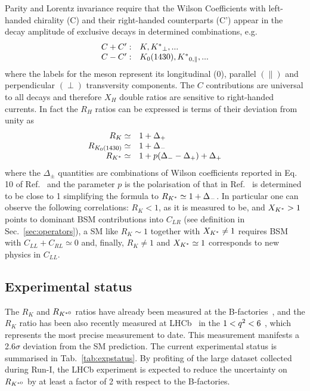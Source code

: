 Parity and Lorentz invariance require that the Wilson Coefficients with left-handed chirality (C)
and their right-handed counterparts (C') appear in the decay amplitude of exclusive decays in
determined combinations, e.g.
\begin{equation}
\begin{array}{ll}
C+C': & K, {{K}^*}_{\perp}, ...  \\
C-C': & K_0(1430), {{K}^*}_{0,\parallel}, ...
\end{array}
\end{equation}
where the labels for the \Kstar meson represent its longitudinal (0), parallel $(\parallel)$ and
perpendicular $(\perp)$ transversity components. The $C$ contributions are universal to
all decays and therefore $X_H$ double ratios are sensitive to right-handed currents.
In fact the $R_H$ ratios can be expressed is terms of their deviation from unity as
\begin{equation}
\begin{array}{rl}
R_K \simeq 			& 1+ \Delta_+ 		\\
R_{K_0(1430)} \simeq 	& 1+ \Delta_-		\\
R_{{K}^*} \simeq 		& 1+ p(\Delta_- - \Delta_+) + \Delta_+
\end{array}
\end{equation}
where the $\Delta_\pm$ quantities are combinations of Wilson coefficients
reported in Eq. 10 of Ref.~\cite{Hiller:2014ula} and the parameter $p$ is the polarisation of \Kstar
that in Ref.~\cite{Hiller:2014ula} is determined to be close to 1 simplifying the formula to $R_{{K}^*} \simeq 1+ \Delta_-$.
In particular one can observe the following correlations: $R_K < 1$, as it is measured to be, and $X_{{{K}^*}} > 1$
points to dominant BSM contributions into $C_{LR}$ (see definition in Sec.~\ref{sec:operators}),
a SM like $R_K \sim 1$ together with $X_{{{K}^*}} \neq 1$ requires BSM with $C_{LL} + C_{RL} \simeq 0$
and, finally, $R_K \neq 1$ and $X_{{{K}^*}} \simeq 1$ corresponds to new physics in $C_{LL}$.

\subsection{Experimental status}

The $R_K$ and $R_{{{K}^{*0}}}$ ratios have already been measured at the B-factories~\cite{Lees:2012tva,Wei:2009zv},
and the $R_K$ ratio has been also recently measured at LHCb~\cite{LHCb-PAPER-2014-024} in the $1 < {q^2} < 6$ \gevgevcccc,
which represents the most precise measurement to date. This measurement manifests a 2.6$\sigma$
deviation from the SM prediction. 
The current experimental status is summarised in Tab.~\ref{tab:expstatus}. By profiting of the large dataset collected during Run-I, the LHCb experiment is expected
to reduce the uncertainty on $R_{{{K}^{*0}}}$ by at least a factor of 2 with respect to the B-factories.

